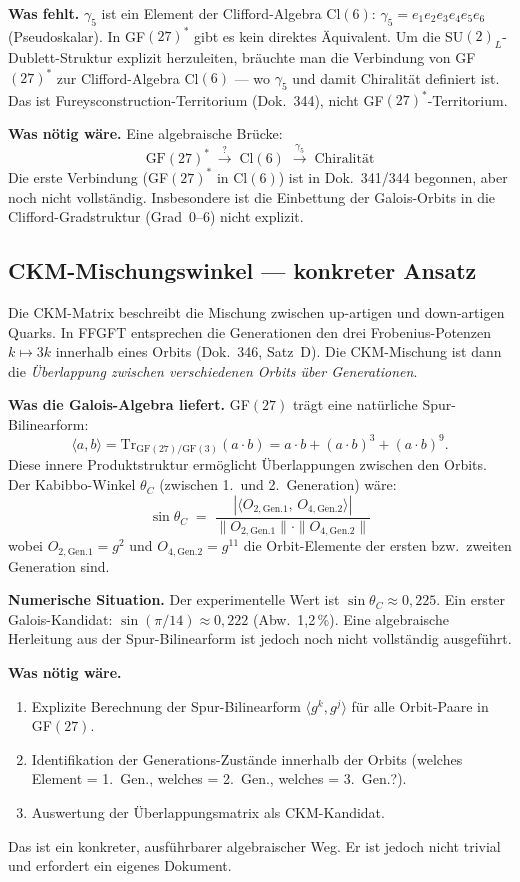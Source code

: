 \textbf{Was fehlt.}
$\gamma_5$ ist ein Element der Clifford-Algebra Cl$(6)$:
$\gamma_5 = e_1 e_2 e_3 e_4 e_5 e_6$ (Pseudoskalar).
In GF$(27)^*$ gibt es kein direktes Äquivalent.
Um die SU$(2)_L$-Dublett-Struktur explizit herzuleiten, bräuchte man
die Verbindung von GF$(27)^*$ zur Clifford-Algebra Cl$(6)$ ---
wo $\gamma_5$ und damit Chiralität definiert ist.
Das ist Fureysconstruction-Territorium (Dok.~344), nicht GF$(27)^*$-Territorium.

\textbf{Was nötig wäre.} Eine algebraische Brücke:
\[
  \text{GF}(27)^* \;\xrightarrow{?}\; \text{Cl}(6) \;\xrightarrow{\gamma_5}\; \text{Chiralität}
\]
Die erste Verbindung (GF$(27)^*$ in Cl$(6)$) ist in Dok.~341/344 begonnen,
aber noch nicht vollständig. Insbesondere ist die Einbettung der Galois-Orbits
in die Clifford-Gradstruktur (Grad~0--6) nicht explizit.

\subsection{CKM-Mischungswinkel --- konkreter Ansatz \SM}

Die CKM-Matrix beschreibt die Mischung zwischen up-artigen und down-artigen
Quarks. In FFGFT entsprechen die Generationen den drei Frobenius-Potenzen
$k \mapsto 3k$ innerhalb eines Orbits (Dok.~346, Satz~D). Die CKM-Mischung
ist dann die \emph{Überlappung zwischen verschiedenen Orbits über Generationen}.

\textbf{Was die Galois-Algebra liefert.}
GF$(27)$ trägt eine natürliche Spur-Bilinearform:
\[
  \langle a, b \rangle = \mathrm{Tr}_{\mathrm{GF}(27)/\mathrm{GF}(3)}(a \cdot b)
  = a \cdot b + (a \cdot b)^3 + (a \cdot b)^9.
\]
Diese innere Produktstruktur ermöglicht Überlappungen zwischen den Orbits.
Der Kabibbo-Winkel $\theta_C$ (zwischen 1.~und 2.~Generation) wäre:
\[
  \sin\theta_C \;=\; \frac{|\langle O_{2,\mathrm{Gen.1}},\, O_{4,\mathrm{Gen.2}}\rangle|}{
    \|O_{2,\mathrm{Gen.1}}\| \cdot \|O_{4,\mathrm{Gen.2}}\|}
\]
wobei $O_{2,\mathrm{Gen.1}} = g^2$ und $O_{4,\mathrm{Gen.2}} = g^{11}$ die
Orbit-Elemente der ersten bzw.\ zweiten Generation sind.

\textbf{Numerische Situation.}
Der experimentelle Wert ist $\sin\theta_C \approx 0{,}225$.
Ein erster Galois-Kandidat: $\sin(\pi/14) \approx 0{,}222$ (Abw.\ 1,2\,\%).
Eine algebraische Herleitung aus der Spur-Bilinearform ist jedoch noch nicht
vollständig ausgeführt.

\textbf{Was nötig wäre.}
\begin{enumerate}
\item Explizite Berechnung der Spur-Bilinearform $\langle g^k, g^j \rangle$
  für alle Orbit-Paare in GF$(27)$.
\item Identifikation der Generations-Zustände innerhalb der Orbits
  (welches Element = 1.~Gen., welches = 2.~Gen., welches = 3.~Gen.?).
\item Auswertung der Überlappungsmatrix als CKM-Kandidat.
\end{enumerate}
Das ist ein konkreter, ausführbarer algebraischer Weg. Er ist jedoch
nicht trivial und erfordert ein eigenes Dokument.

